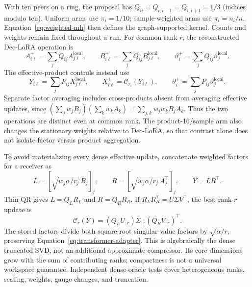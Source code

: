 \documentclass[11pt]{article}
\begin{document}
With ten peers on a ring, the proposal has $Q_{ii}=Q_{i,i-1}=Q_{i,i+1}=1/3$ (indices modulo ten). Uniform arms use $\pi_i=1/10$; sample-weighted arms use $\pi_i=n_i/n$. Equation~\eqref{eq:weighted-mh} then defines the graph-supported kernel. Counts and weights remain fixed throughout a run. For common rank $r$, the reconstructed Dec-LoRA operation is
\begin{equation}
 A_{i\ell}^{+}=\sum_jQ_{ij}A_{j\ell}^{\mathrm{local}},\qquad
 B_{i\ell}^{+}=\sum_jQ_{ij}B_{j\ell}^{\mathrm{local}},\qquad
 \vartheta_i^{+}=\sum_jQ_{ij}\vartheta_j^{\mathrm{local}}.
 \label{eq:declora-factor}
\end{equation}
The effective-product controls instead use
\begin{equation}
 Y_{i\ell}=\sum_jP_{ij}X_{j\ell}^{\mathrm{local}},\qquad
 X_{i\ell}^{+}=\mathcal C_{r_i}(Y_{i\ell}),\qquad
 \vartheta_i^{+}=\sum_jP_{ij}\vartheta_j^{\mathrm{local}}.
 \label{eq:quantity-product}
\end{equation}
Separate factor averaging includes cross-products absent from averaging effective updates, since $(\sum_jw_jB_j)(\sum_kw_kA_k)=\sum_{j,k}w_jw_kB_jA_k$. Thus the two operations are distinct even at common rank. The product-16/sample arm also changes the stationary weights relative to Dec-LoRA, so that contrast alone does not isolate factor versus product aggregation.

To avoid materializing every dense effective update, concatenate weighted factors for a receiver as
\begin{equation}
 L=[\sqrt{w_j\alpha/r_j}\,B_j]_j,\qquad
 R=[\sqrt{w_j\alpha/r_j}\,A_j^\top]_j,\qquad Y=LR^\top.
\end{equation}
Thin QR gives $L=Q_LR_L$ and $R=Q_RR_R$. If $R_LR_R^\top=U\Sigma V^\top$, the best rank-$r$ update is
\begin{equation}
 \mathcal C_r(Y)=(Q_LU_{:r})\Sigma_{:r}(Q_RV_{:r})^\top.
 \label{eq:compact-merge}
\end{equation}
The stored factors divide both square-root singular-value factors by $\sqrt{\alpha/r}$, preserving Equation~\eqref{eq:transformer-adapter}. This is algebraically the dense truncated SVD, not an additional approximate compressor. Its core dimensions grow with the sum of contributing ranks; compactness is not a universal workspace guarantee. Independent dense-oracle tests cover heterogeneous ranks, scaling, weights, gauge changes, and truncation.
\end{document}
